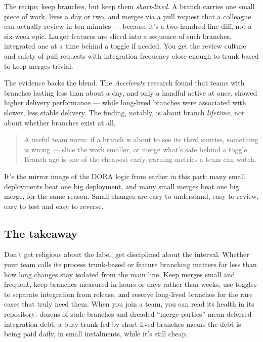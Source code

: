 The recipe: keep branches, but keep them \emph{short-lived}. A branch carries one small piece of work, lives a day or two, and merges via a pull request that a colleague can actually review in ten minutes — because it's a two-hundred-line diff, not a six-week epic. Larger features are sliced into a sequence of such branches, integrated one at a time behind a toggle if needed. You get the review culture and safety of pull requests with integration frequency close enough to trunk-based to keep merges trivial.


The evidence backs the blend. The \emph{Accelerate} research found that teams with branches lasting less than about a day, and only a handful active at once, showed higher delivery performance — while long-lived branches were associated with slower, less stable delivery. The finding, notably, is about branch \emph{lifetime}, not about whether branches exist at all.



\begin{quote}\small
A useful team norm: if a branch is about to see its third sunrise, something is wrong — slice the work smaller, or merge what's safe behind a toggle. Branch age is one of the cheapest early-warning metrics a team can watch.
\end{quote}


It's the mirror image of the DORA logic from earlier in this part: many small deployments beat one big deployment, and many small merges beat one big merge, for the same reason. Small changes are easy to understand, easy to review, easy to test and easy to reverse.



\subsection{The takeaway}


Don't get religious about the label; get disciplined about the interval. Whether your team calls its process trunk-based or feature branching matters far less than how long changes stay isolated from the main line. Keep merges small and frequent, keep branches measured in hours or days rather than weeks, use toggles to separate integration from release, and reserve long-lived branches for the rare cases that truly need them. When you join a team, you can read its health in its repository: dozens of stale branches and dreaded ``merge parties'' mean deferred integration debt; a busy trunk fed by short-lived branches means the debt is being paid daily, in small instalments, while it's still cheap.

